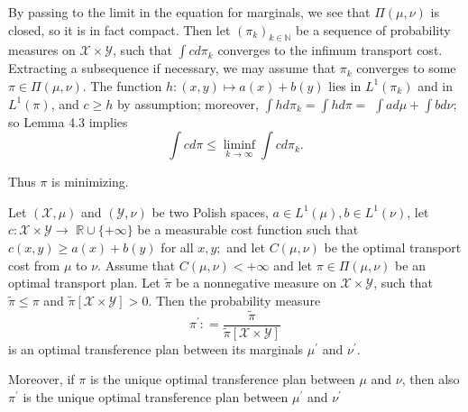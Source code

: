 By passing to the limit in the equation for marginals, we see that \( \Pi ( \mu , \nu ) \) is closed, so it is in fact compact. Then let \( \left( \pi _ { k } \right) _ { k \in \mathbb { N } } \) be a sequence of probability measures on \( \mathcal { X } \times \mathcal { Y } \), such that \( \int c d \pi _ { k } \) converges to the infimum transport cost. Extracting a subsequence if necessary, we may assume that \( \pi _ { k } \) converges to some \( \pi \in \Pi ( \mu , \nu ) . \) The function \( h: ( x , y ) \longmapsto a ( x ) + b ( y ) \) lies in \( L ^ { 1 } \left( \pi _ { k } \right) \) and in \( L ^ { 1 } ( \pi ) \), and \( c \geq h \) by assumption; moreover, \( \int h d \pi _ { k } = \int h d \pi = \) \( \int a d \mu + \int b d \nu \); so Lemma 4.3 implies
\[ \int c d \pi \leq \liminf _ { k \rightarrow \infty } \int c d \pi _ { k }. \]

Thus $\pi$ is minimizing.

\begin{thm}
	\label{thm:restriction_optimal_plan}
	Let \( (\mathcal { X } , \mu ) \)
	and \( ( \mathcal { Y } , \nu ) \) be two Polish spaces, \( a \in L ^ { 1 } ( \mu ) , b \in L ^ { 1 } ( \nu ) \), let \( c : \mathcal { X } \times \mathcal { Y } \rightarrow \)
	\( \mathbb { R } \cup \{ + \infty \} \) be a measurable cost function such that \( c ( x , y ) \geq a ( x ) + b ( y ) \)
	for all \( x , y ; \) and let \( C ( \mu , \nu ) \) be the optimal transport cost from \( \mu \) to \( \nu . \)
	Assume that \( C ( \mu , \nu ) < + \infty \) and let \( \pi \in \Pi ( \mu , \nu ) \) be an optimal transport plan. Let \( \widetilde { \pi } \) be a nonnegative measure on \( \mathcal { X } \times \mathcal { Y } \), such that \( \widetilde { \pi } \leq \pi \)
	and \( \widetilde { \pi } [ \mathcal { X } \times \mathcal { Y } ] > 0 . \) Then the probability measure
	\[ \pi ^ { \prime } : = \frac { \widetilde { \pi } } { \widetilde { \pi } [ \mathcal { X } \times \mathcal { Y } ] } \]
	is an optimal transference plan between its marginals \( \mu ^ { \prime } \) and \( \nu ^ { \prime } \).

	Moreover, if \( \pi \) is the unique optimal transference plan between \( \mu \)
	and \( \nu \), then also \( \pi ^ { \prime } \) is the unique optimal transference plan between \( \mu ^ { \prime } \)
	and \( \nu ^ { \prime } \)
\end{thm}

